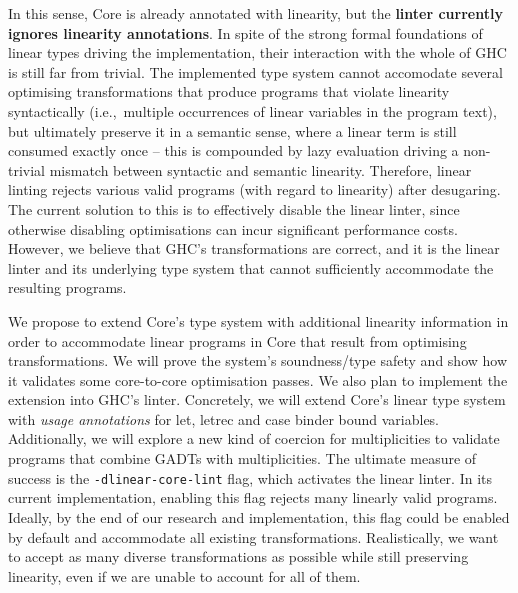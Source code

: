 \documentclass[]{lwnovathesis}
\begin{document}
In this sense, Core is already annotated with linearity, but the \textbf{linter currently
  ignores linearity annotations}.
%
In spite of the strong formal foundations of linear types driving the
implementation, their interaction with the whole of GHC is still far
from trivial. The implemented type system cannot accomodate
several optimising transformations that produce programs that violate
linearity syntactically (i.e.,~multiple occurrences of linear
variables in the program text), but ultimately preserve it in a
semantic sense, where a linear term is still consumed exactly once --
this is compounded by lazy evaluation driving a non-trivial mismatch
between syntactic and semantic linearity. Therefore, linear linting
rejects various valid programs (with regard to linearity) after
desugaring. The current solution to this is to effectively disable the
linear linter, since otherwise disabling optimisations can incur significant
performance costs. However, we believe that GHC's transformations are
correct, and it is the linear linter and its underlying type system
that cannot sufficiently accommodate the
resulting programs.


We propose to extend Core's type system with additional linearity
information in order to accommodate linear programs in Core that
result from optimising transformations. We will prove the system's
soundness/type safety and show how it validates some core-to-core optimisation
passes. We also plan to implement the extension into GHC's
linter. Concretely, we will extend Core's linear type system with
\emph{usage annotations} for let, letrec and case binder bound
variables. Additionally, we will explore a new kind of coercion for
multiplicities to validate programs that combine GADTs with
multiplicities.
%
The ultimate measure of success is the \verb=-dlinear-core-lint= flag,
which activates the linear linter. In its current implementation,
enabling this flag rejects many linearly valid programs. Ideally, by
the end of our research and implementation, this flag could be enabled by
default and accommodate all existing transformations. Realistically, we want to
accept as many diverse transformations as possible while still preserving
linearity, even if we are unable to account for all of them.
\end{document}

